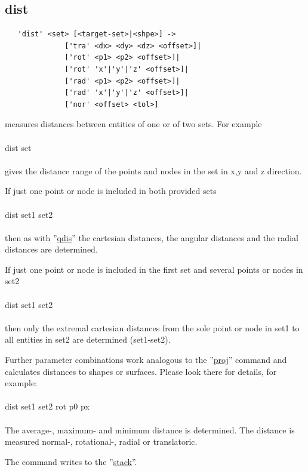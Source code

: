 \documentclass{article}
\providecommand{\htmlref}[2]{\hyperref[#2]{#1}}
\begin{document}
\subsection{\label{dist}dist}
\begin{verbatim}
   'dist' <set> [<target-set>|<shpe>] ->
              ['tra' <dx> <dy> <dz> <offset>]|
              ['rot' <p1> <p2> <offset>]|
              ['rot' 'x'|'y'|'z' <offset>]|
              ['rad' <p1> <p2> <offset>]|
              ['rad' 'x'|'y'|'z' <offset>]|
              ['nor' <offset> <tol>]   
\end{verbatim}
measures distances between entities of one or of two sets. For example \\\\
dist set \\\\
gives the distance range of the points and nodes in the set in x,y and z direction.

If just one point or node is included in both provided sets \\\\
dist set1 set2 \\\\
then as with ''\htmlref{qdis}{qdis}'' the cartesian distances, the angular distances and the radial distances are determined.

If just one point or node is included in the first set and several points or nodes in set2 \\\\
dist set1 set2 \\\\
then only the extremal cartesian distances from the sole point or node in set1 to all entities in set2 are determined (set1-set2).

Further parameter combinations work analogous to the ''\htmlref{proj}{proj}'' command and calculates distances to shapes or surfaces. Please look there for details, for example:\\\\
dist set1 set2 rot p0 px \\\\
The average-, maximum- and minimum distance is determined. The distance is measured normal-, rotational-, radial or translatoric. 

The command writes to the ''\htmlref{stack}{stack}''.
 
\end{document}
